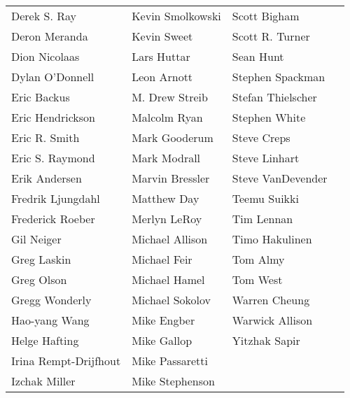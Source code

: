 \begin{center}
\begin{tabular}{llll}
Derek S. Ray & Kevin Smolkowski & Scott Bigham\\
Deron Meranda & Kevin Sweet & Scott R. Turner\\
Dion Nicolaas & Lars Huttar & Sean Hunt\\
Dylan O'Donnell & Leon Arnott & Stephen Spackman\\
Eric Backus & M. Drew Streib & Stefan Thielscher\\
Eric Hendrickson & Malcolm Ryan & Stephen White\\
Eric R. Smith & Mark Gooderum & Steve Creps\\
Eric S. Raymond & Mark Modrall & Steve Linhart\\
Erik Andersen & Marvin Bressler & Steve VanDevender\\
Fredrik Ljungdahl & Matthew Day & Teemu Suikki\\
Frederick Roeber & Merlyn LeRoy & Tim Lennan\\
Gil Neiger & Michael Allison & Timo Hakulinen\\
Greg Laskin & Michael Feir & Tom Almy\\
Greg Olson & Michael Hamel & Tom West\\
Gregg Wonderly & Michael Sokolov & Warren Cheung\\
Hao-yang Wang & Mike Engber & Warwick Allison\\
Helge Hafting & Mike Gallop & Yitzhak Sapir\\
Irina Rempt-Drijfhout & Mike Passaretti\\
Izchak Miller & Mike Stephenson
\end{tabular}
\end{center}
\clearpage


